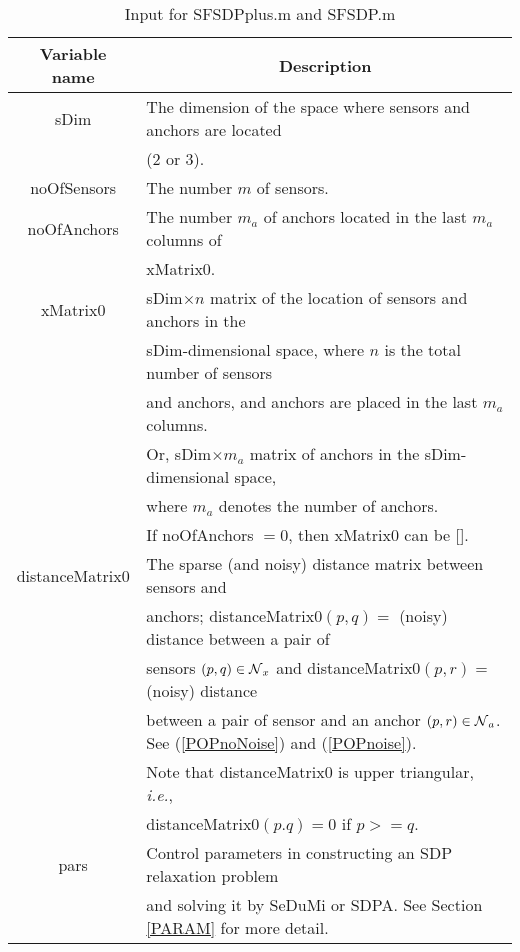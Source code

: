 \documentclass[12pt]{article}
\def\NC{\mbox{$\cal N$}}
\begin{document}
\begin{table}
\begin{tabular}{|c|l|} \hline 
Variable name & \multicolumn{1}{c|}{Description} \\ \hline
    sDim &   The dimension of the space where sensors and anchors are
           located\\ & (2 or 3).  \\ 
 noOfSensors   & The number $m$ of sensors. \\
 noOfAnchors   &  The number $m_a$ of anchors located in the last $m_a$ columns of \\ 
                            &  xMatrix0. \\ 
 xMatrix0  &   sDim$\times n$ matrix of the location of sensors and anchors in the\\ 
               &  sDim-dimensional space, where $n$ is the total number of sensors \\   
               &and anchors, and anchors are placed in the last $m_a$ columns.                \\
            & Or, sDim$\times  m_a$ matrix of anchors in the sDim-dimensional space,\\
              & where $m_a$ denotes the number of anchors. \\
              & If noOfAnchors $=0$, then xMatrix0 can be [].\\
 distanceMatrix0 & The sparse (and noisy) distance matrix between sensors and \\ 
&  anchors;  distanceMatrix0$(p,q) = $  (noisy) distance between a pair of \\ 
 & sensors $(p,q) \in \NC_x$ and distanceMatrix0$(p,r) = $  (noisy) distance \\ 
&  between a pair of sensor and an anchor  $(p,r) \in \NC_a$. See (\ref{POPnoNoise}) 
and (\ref{POPnoise}). \\ 
&  Note that  distanceMatrix0 is upper triangular, {\it i.e.}, \\ 
& distanceMatrix0$(p.q) = 0$  if $p >= q$. \\ 
pars & Control parameters in constructing an SDP relaxation problem \\ 
         & and solving it by SeDuMi or SDPA. See Section \ref{PARAM} for more detail. 
  \\ \hline
            \end{tabular}  
      \caption{Input for SFSDPplus.m and SFSDP.m}
       \label{INPUT2}
  \end{table}
\end{document}
